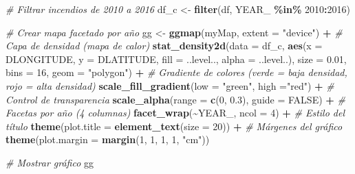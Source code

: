 \documentclass[
]{book}
\newenvironment{Shaded}{\begin{snugshade}}{\end{snugshade}}
\newcommand{\AttributeTok}[1]{\textcolor[rgb]{0.13,0.29,0.53}{#1}}
\newcommand{\CommentTok}[1]{\textcolor[rgb]{0.56,0.35,0.01}{\textit{#1}}}
\newcommand{\ConstantTok}[1]{\textcolor[rgb]{0.56,0.35,0.01}{#1}}
\newcommand{\DecValTok}[1]{\textcolor[rgb]{0.00,0.00,0.81}{#1}}
\newcommand{\FloatTok}[1]{\textcolor[rgb]{0.00,0.00,0.81}{#1}}
\newcommand{\FunctionTok}[1]{\textcolor[rgb]{0.13,0.29,0.53}{\textbf{#1}}}
\newcommand{\NormalTok}[1]{#1}
\newcommand{\OtherTok}[1]{\textcolor[rgb]{0.56,0.35,0.01}{#1}}
\newcommand{\SpecialCharTok}[1]{\textcolor[rgb]{0.81,0.36,0.00}{\textbf{#1}}}
\newcommand{\StringTok}[1]{\textcolor[rgb]{0.31,0.60,0.02}{#1}}
\begin{document}
\begin{Shaded}
\begin{Highlighting}[]
\CommentTok{\# Filtrar incendios de 2010 a 2016}
\NormalTok{df\_c }\OtherTok{\textless{}{-}} \FunctionTok{filter}\NormalTok{(df, YEAR\_ }\SpecialCharTok{\%in\%} \DecValTok{2010}\SpecialCharTok{:}\DecValTok{2016}\NormalTok{)}

\CommentTok{\# Crear mapa facetado por año}
\NormalTok{gg }\OtherTok{\textless{}{-}} \FunctionTok{ggmap}\NormalTok{(myMap, }\AttributeTok{extent =} \StringTok{"device"}\NormalTok{) }\SpecialCharTok{+} 
  \CommentTok{\# Capa de densidad (mapa de calor)}
  \FunctionTok{stat\_density2d}\NormalTok{(}\AttributeTok{data =}\NormalTok{ df\_c, }
                 \FunctionTok{aes}\NormalTok{(}\AttributeTok{x =}\NormalTok{ DLONGITUDE, }\AttributeTok{y =}\NormalTok{ DLATITUDE, }
                     \AttributeTok{fill =}\NormalTok{ ..level.., }\AttributeTok{alpha =}\NormalTok{ ..level..),}
                 \AttributeTok{size =} \FloatTok{0.01}\NormalTok{, }\AttributeTok{bins =} \DecValTok{16}\NormalTok{, }\AttributeTok{geom =} \StringTok{"polygon"}\NormalTok{) }\SpecialCharTok{+}
  \CommentTok{\# Gradiente de colores (verde = baja densidad, rojo = alta densidad)}
  \FunctionTok{scale\_fill\_gradient}\NormalTok{(}\AttributeTok{low =} \StringTok{"green"}\NormalTok{, }\AttributeTok{high =}\StringTok{"red"}\NormalTok{) }\SpecialCharTok{+} 
  \CommentTok{\# Control de transparencia}
  \FunctionTok{scale\_alpha}\NormalTok{(}\AttributeTok{range =} \FunctionTok{c}\NormalTok{(}\DecValTok{0}\NormalTok{, }\FloatTok{0.3}\NormalTok{), }\AttributeTok{guide =} \ConstantTok{FALSE}\NormalTok{) }\SpecialCharTok{+} 
  \CommentTok{\# Facetas por año (4 columnas)}
  \FunctionTok{facet\_wrap}\NormalTok{(}\SpecialCharTok{\textasciitilde{}}\NormalTok{YEAR\_, }\AttributeTok{ncol =} \DecValTok{4}\NormalTok{) }\SpecialCharTok{+}
  \CommentTok{\# Estilo del título}
  \FunctionTok{theme}\NormalTok{(}\AttributeTok{plot.title =} \FunctionTok{element\_text}\NormalTok{(}\AttributeTok{size =} \DecValTok{20}\NormalTok{)) }\SpecialCharTok{+}
  \CommentTok{\# Márgenes del gráfico}
  \FunctionTok{theme}\NormalTok{(}\AttributeTok{plot.margin =} \FunctionTok{margin}\NormalTok{(}\DecValTok{1}\NormalTok{, }\DecValTok{1}\NormalTok{, }\DecValTok{1}\NormalTok{, }\DecValTok{1}\NormalTok{, }\StringTok{"cm"}\NormalTok{))}

\CommentTok{\# Mostrar gráfico}
\NormalTok{gg}
\end{Highlighting}
\end{Shaded}
\end{document}
